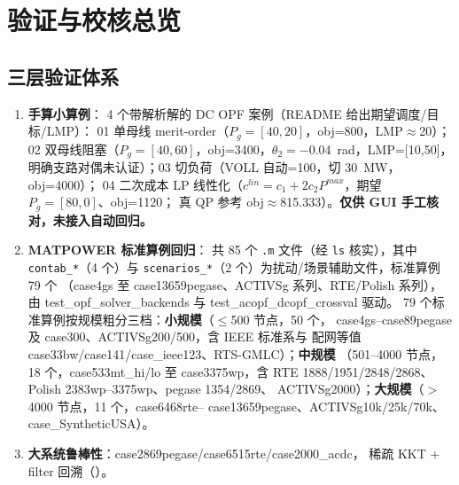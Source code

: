 \section{验证与校核总览}\label{sec:validation}

\subsection{三层验证体系}
\begin{enumerate}
  \item \textbf{手算小算例}： 4 个带解析解的
        DC OPF 案例（README 给出期望调度/目标/LMP）：
        01 单母线 merit-order（$P_g=[40,20]$，obj=800，LMP$\approx$20）；
        02 双母线阻塞（$P_g=[40,60]$，obj=3400，$\theta_2=-0.04$~rad，LMP=[10,50]，
        明确支路对偶未认证）；03 切负荷（VOLL 自动=100，切 30~MW，obj=4000）；
        04 二次成本 LP 线性化（$c^{lin}=c_1+2c_2P^{max}$，期望 $P_g=[80,0]$、obj=1120；
        真 QP 参考 obj$\approx$815.333）。\textbf{仅供 GUI 手工核对，未接入自动回归。}
  \item \textbf{MATPOWER 标准算例回归}： 共 85 个
        \texttt{.m} 文件（经 \texttt{ls} 核实），其中 \texttt{contab\_*}（4 个）与
        \texttt{scenarios\_*}（2 个）为扰动/场景辅助文件，标准算例 79 个
        （case4gs 至 case13659pegase、ACTIVSg 系列、RTE/Polish 系列），
        由 test\_opf\_solver\_backends 与 test\_acopf\_dcopf\_crossval 驱动。
        79 个标准算例按规模粗分三档：\textbf{小规模}（$\le$500 节点，50 个，
        case4gs--case89pegase 及 case300、ACTIVSg200/500，含 IEEE 标准系与
        配网等值 case33bw/case141/case\_ieee123、RTS-GMLC）；\textbf{中规模}
        （501--4000 节点，18 个，case533mt\_hi/lo 至 case3375wp，含 RTE
        1888/1951/2848/2868、Polish 2383wp--3375wp、pegase 1354/2869、
        ACTIVSg2000）；\textbf{大规模}（$>$4000 节点，11 个，case6468rte--%
        case13659pegase、ACTIVSg10k/25k/70k、case\_SyntheticUSA）。
  \item \textbf{大系统鲁棒性}：case2869pegase/case6515rte/case2000\_acdc，
        稀疏 KKT + filter 回溯（）。
\end{enumerate}

